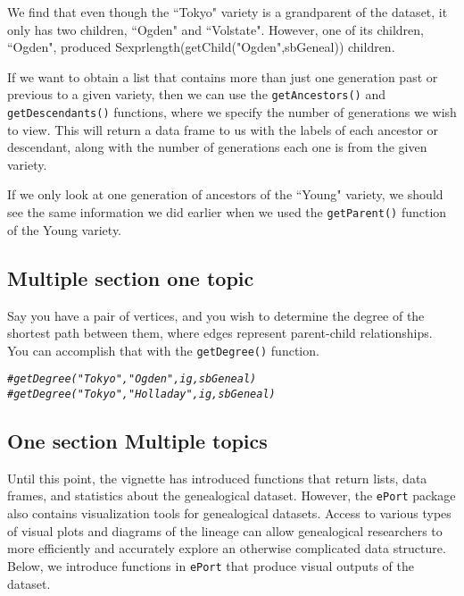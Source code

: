 \documentclass{article}\usepackage[]{graphicx}\usepackage[]{color}
\makeatletter
\newcommand{\hlcom}[1]{\textcolor[rgb]{0.678,0.584,0.686}{\textit{#1}}}%
\newenvironment{kframe}{%
 \def\at@end@of@kframe{}%
 \ifinner\ifhmode%
  \def\at@end@of@kframe{\end{minipage}}%
  \begin{minipage}{\columnwidth}%
 \fi\fi%
 \def\FrameCommand##1{\hskip\@totalleftmargin \hskip-\fboxsep
 \colorbox{shadecolor}{##1}\hskip-\fboxsep
     \hskip-\linewidth \hskip-\@totalleftmargin \hskip\columnwidth}%
 \MakeFramed {\advance\hsize-\width
   \@totalleftmargin\z@ \linewidth\hsize
   \@setminipage}}%
 {\par\unskip\endMakeFramed%
 \at@end@of@kframe}
\newenvironment{knitrout}{}{} %
\numberwithin{equation}{section} %
\newcommand{\pkg}[1]{{\texttt{#1}}}
\makeatother
\begin{document}
We find that even though the ``Tokyo" variety is a grandparent of the dataset, it only has two children, ``Ogden" and ``Volstate". However, one of its children, ``Ogden", produced Sexpr{length(getChild("Ogden",sbGeneal))} children.

If we want to obtain a list that contains more than just one generation past or previous to a given variety, then we can use the \texttt{getAncestors()} and \texttt{getDescendants()} functions, where we specify the number of generations we wish to view. This will return a data frame to us with the labels of each ancestor or descendant, along with the number of generations each one is from the given variety.

If we only look at one generation of ancestors of the ``Young" variety, we should see the same information we did earlier when we used the \texttt{getParent()} function of the Young variety.

\subsection{{Multiple section one topic}}

Say you have a pair of vertices, and you wish to determine the degree of the shortest path between them, where edges represent parent-child relationships. You can accomplish that with the \texttt{getDegree()} function.

\begin{knitrout}
\color{fgcolor}\begin{kframe}
\begin{alltt}
\hlcom{#getDegree("Tokyo", "Ogden", ig, sbGeneal)}
\hlcom{#getDegree("Tokyo", "Holladay", ig, sbGeneal)}
\end{alltt}
\end{kframe}
\end{knitrout}

\subsection{One section Multiple topics}

Until this point, the vignette has introduced functions that return lists, data frames, and statistics about the genealogical dataset. However, the \pkg{ePort} package also contains visualization tools for genealogical datasets. Access to various types of visual plots and diagrams of the lineage can allow genealogical researchers to more efficiently and accurately explore an otherwise complicated data structure. Below, we introduce functions in \pkg{ePort} that produce visual outputs of the dataset.
\end{document}
